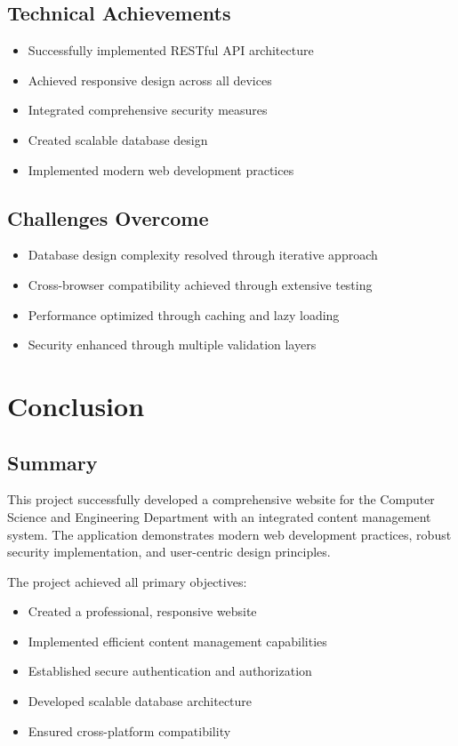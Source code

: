 \documentclass[12pt,a4paper]{report}
\begin{document}
\section{Technical Achievements}
\begin{itemize}
    \item Successfully implemented RESTful API architecture
    \item Achieved responsive design across all devices
    \item Integrated comprehensive security measures
    \item Created scalable database design
    \item Implemented modern web development practices
\end{itemize}

\section{Challenges Overcome}
\begin{itemize}
    \item Database design complexity resolved through iterative approach
    \item Cross-browser compatibility achieved through extensive testing
    \item Performance optimized through caching and lazy loading
    \item Security enhanced through multiple validation layers
\end{itemize}

\chapter{Conclusion}
\label{chap:conclusion}

\section{Summary}
This project successfully developed a comprehensive website for the Computer Science and Engineering Department with an integrated content management system. The application demonstrates modern web development practices, robust security implementation, and user-centric design principles.

The project achieved all primary objectives:
\begin{itemize}
    \item Created a professional, responsive website
    \item Implemented efficient content management capabilities
    \item Established secure authentication and authorization
    \item Developed scalable database architecture
    \item Ensured cross-platform compatibility
\end{itemize}
\end{document}
